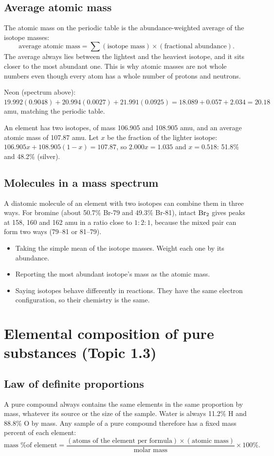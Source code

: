 \documentclass[11pt]{article}
\begin{document}
\subsection{Average atomic mass}
The atomic mass on the periodic table is the abundance-weighted average of the isotope masses:
\[ \text{average atomic mass} = \sum (\text{isotope mass}) \times (\text{fractional abundance}). \]
The average always lies between the lightest and the heaviest isotope, and it sits closer to the most abundant one. This is why atomic masses are not whole numbers even though every atom has a whole number of protons and neutrons.

 Neon (spectrum above): $19.992(0.9048) + 20.994(0.0027) + 21.991(0.0925) = 18.089 + 0.057 + 2.034 = 20.18$ amu, matching the periodic table.

 An element has two isotopes, of mass 106.905 and 108.905 amu, and an average atomic mass of 107.87 amu. Let $x$ be the fraction of the lighter isotope: $106.905x + 108.905(1-x) = 107.87$, so $2.000x = 1.035$ and $x = 0.518$: 51.8\% and 48.2\% (silver).

\subsection{Molecules in a mass spectrum}
A diatomic molecule of an element with two isotopes can combine them in three ways. For bromine (about 50.7\% Br-79 and 49.3\% Br-81), intact $\ce{Br2}$ gives peaks at 158, 160 and 162 amu in a ratio close to $1:2:1$, because the mixed pair can form two ways (79--81 or 81--79).

\errorsh
\begin{itemize}
\item Taking the simple mean of the isotope masses. Weight each one by its abundance.
\item Reporting the most abundant isotope's mass as the atomic mass.
\item Saying isotopes behave differently in reactions. They have the same electron configuration, so their chemistry is the same.
\end{itemize}

\section{Elemental composition of pure substances (Topic 1.3)}\label{t:1.3}
\subsection{Law of definite proportions}
A pure compound always contains the same elements in the same proportion by mass, whatever its source or the size of the sample. Water is always 11.2\% H and 88.8\% O by mass. Any sample of a pure compound therefore has a fixed mass percent of each element:
\[ \text{mass \% of element} = \frac{(\text{atoms of the element per formula}) \times (\text{atomic mass})}{\text{molar mass}} \times 100\%. \]
\end{document}
